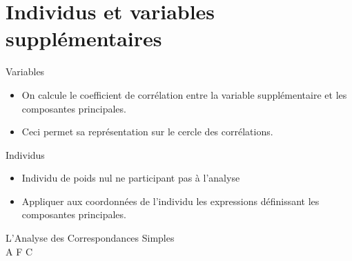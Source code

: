 \documentclass[12pt]{beamer}
\begin{document}
\section{Individus et variables supplémentaires }



\begin{frame}{ Variables }

 \begin{itemize}
 \item   On calcule le coefficient de corrélation entre la variable supplémentaire et les composantes principales. 
 
 \item Ceci permet sa représentation sur le cercle des corrélations.
 
 \end{itemize}


\end{frame}


 

\begin{frame}{ Individus }

 \begin{itemize}
 \item   Individu de poids nul ne participant pas à l’analyse  
 
\item Appliquer aux coordonnées de l’individu les expressions
définissant les composantes principales.
 \end{itemize}


\end{frame}


\begin{frame}
\centering
 \begin{Large}
 
 
L'Analyse des Correspondances Simples  \\



A F C
\end{Large}





\end{frame}



\end{document}
